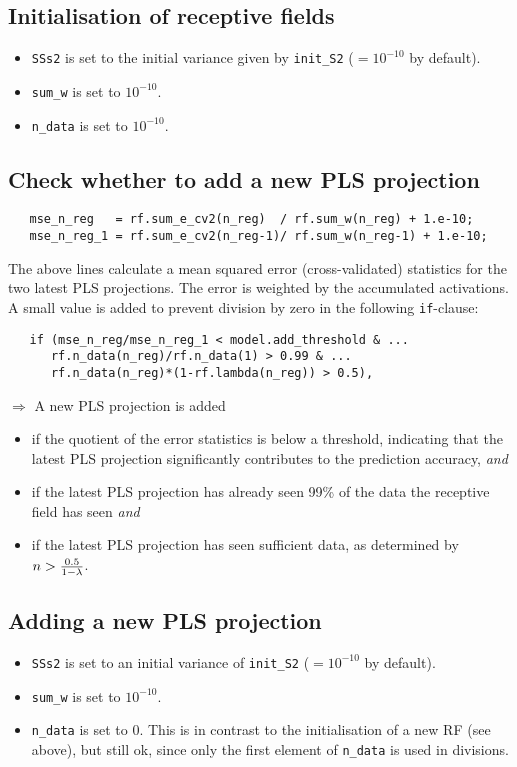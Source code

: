 \documentclass[11pt,a4paper]{article}
\newcommand{\var}[1]{{\tt #1}}
\begin{document}
\subsection{Initialisation of receptive fields}
\begin{itemize}
\item \var{SSs2} is set to the initial variance given by \var{init\_S2} ($=10^{-10}$ by default).
\item \var{sum\_w} is set to $10^{-10}$.
\item \var{n\_data} is set to $10^{-10}$.
\end{itemize}

\subsection{Check whether to add a new PLS projection}
\label{secCheckPLS}
\begin{verbatim}
   mse_n_reg   = rf.sum_e_cv2(n_reg)  / rf.sum_w(n_reg) + 1.e-10;
   mse_n_reg_1 = rf.sum_e_cv2(n_reg-1)/ rf.sum_w(n_reg-1) + 1.e-10;
\end{verbatim}
The above lines calculate a mean squared error (cross-validated)
statistics for the two latest PLS projections. The error is weighted
by the accumulated activations. A small value is added to prevent
division by zero in the following \var{if}-clause:
\begin{verbatim}
   if (mse_n_reg/mse_n_reg_1 < model.add_threshold & ...
      rf.n_data(n_reg)/rf.n_data(1) > 0.99 & ...
      rf.n_data(n_reg)*(1-rf.lambda(n_reg)) > 0.5),
\end{verbatim}
$\Rightarrow$ A new PLS projection is added
\begin{itemize}
\item if the quotient
of the error statistics is below a threshold, indicating that
the latest PLS projection significantly contributes to the
prediction accuracy, \emph{and} 
\item if the latest PLS projection
has already seen 99\% of the data the receptive field has seen
\emph{and} 
\item if the latest PLS projection has seen sufficient data, as
determined by $n > \frac{0.5}{1-\var{\lambda}}$. 
\end{itemize}

\subsection{Adding a new PLS projection}
\begin{itemize}
\item \var{SSs2} is set to an initial variance of \var{init\_S2} ($=10^{-10}$ by default).
\item \var{sum\_w} is set to $10^{-10}$.
\item \var{n\_data} is set to $0$. This is in contrast to the initialisation
of a new RF (see above), but still ok, since only the first element of \var{n\_data}
is used in divisions.
\end{itemize}
\end{document}
